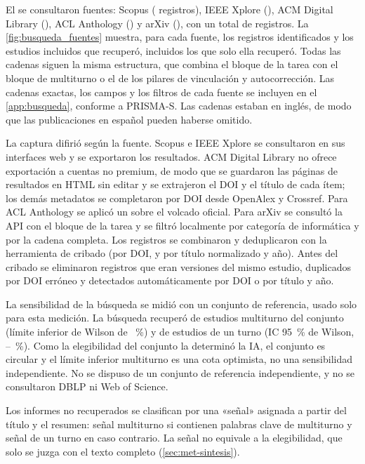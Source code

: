 

El \fechaBusqueda{} se consultaron \nBases{} fuentes: Scopus (\nBaseScopus{} registros), IEEE Xplore (\nBaseIEEE{}), ACM Digital Library (\nBaseACM{}), ACL Anthology (\nBaseACL{}) y arXiv (\nBaseArxiv{}), con un total de \nIdentificados{} registros. La \cref{fig:busqueda_fuentes} muestra, para cada fuente, los registros identificados y los estudios incluidos que recuperó, incluidos los que solo ella recuperó. Todas las cadenas siguen la misma estructura, que combina el bloque de la tarea con el bloque de multiturno o el de los pilares de vinculación y autocorrección. Las cadenas exactas, los campos y los filtros de cada fuente se incluyen en el \cref{app:busqueda}, conforme a PRISMA-S. Las cadenas estaban en inglés, de modo que las publicaciones en español pueden haberse omitido.

La captura difirió según la fuente. Scopus e IEEE Xplore se consultaron en sus interfaces web y se exportaron los resultados. ACM Digital Library no ofrece exportación a cuentas no premium, de modo que se guardaron las páginas de resultados en HTML sin editar y se extrajeron el DOI y el título de cada ítem; los demás metadatos se completaron por DOI desde OpenAlex y Crossref. Para ACL Anthology se aplicó un  sobre el volcado oficial. Para arXiv se consultó la API con el bloque de la tarea y se filtró localmente por categoría de informática y por la cadena completa. Los registros se combinaron y deduplicaron con la herramienta de cribado (por DOI, y por título normalizado y año). Antes del cribado se eliminaron \nDupVersiones{} registros que eran versiones del mismo estudio, \nDupDOI{} duplicados por DOI erróneo y \nDupHerramienta{} detectados automáticamente por DOI o por título y año.

La sensibilidad de la búsqueda se midió con un conjunto de referencia, usado solo para esta medición. La búsqueda recuperó \nRefMTHallados{} de \nRefMT{} estudios multiturno del conjunto (límite inferior de Wilson de ~\%) y \nRefUTHallados{} de \nRefUT{} estudios de un turno (IC 95~\% de Wilson, \sensUTInf--\sensUTSup~\%). Como la elegibilidad del conjunto la determinó la IA, el conjunto es circular y el límite inferior multiturno es una cota optimista, no una sensibilidad independiente. No se dispuso de un conjunto de referencia independiente, y no se consultaron DBLP ni Web of Science.

Los informes no recuperados se clasifican por una «señal» asignada a partir del título y el resumen: señal multiturno si contienen palabras clave de multiturno y señal de un turno en caso contrario. La señal no equivale a la elegibilidad, que solo se juzga con el texto completo (\cref{sec:met-sintesis}).

